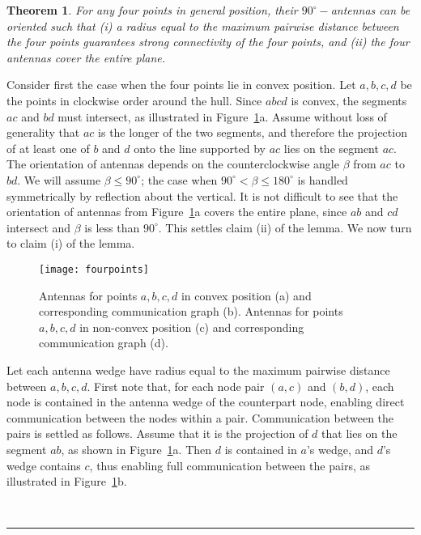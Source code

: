 \documentclass[11pt]{article}
\newtheorem{theorem}{Theorem}
\newcommand{\qed}{\rule{0.5em}{1.5ex}}
\newcommand{\fqed}{{\hfill~\qed}}
\newenvironment{proof}{{\noindent \bf Proof.}}
                      {{\hfill \fqed} \vspace{1em}}
\begin{document}
\begin{theorem}
For any four points in general position, their $90^\circ-$antennas
can be oriented such that (i) a radius equal to the maximum pairwise
distance between the four points guarantees strong connectivity
of the four points, and (ii) the four antennas cover the entire plane.
\label{thm:fourpoints}
\end{theorem}
\begin{proof}
Consider first the case when the four points lie in convex
position. Let $a, b, c, d$ be the points in clockwise order around
the hull. Since $abcd$ is convex, the segments $ac$ and $bd$ must
intersect, as illustrated in Figure~\ref{fig:fourpoints}a.
Assume without loss of generality that $ac$ is the longer of the
two segments, and therefore the projection of at least one of $b$
and $d$ onto the line supported by $ac$ lies on the segment $ac$.
The orientation of antennas depends on the counterclockwise
angle $\beta$ from $ac$ to $bd$. We will assume $\beta \leq 90^\circ$;
the case when $90^\circ < \beta \leq 180^\circ$ is handled
symmetrically by reflection about the vertical.
It is not difficult to see that the orientation of antennas
from Figure~\ref{fig:fourpoints}a covers the entire plane, since
$ab$ and $cd$ intersect and $\beta$ is less than $90^\circ$. This
settles claim (ii) of the lemma. We now turn to claim (i) of the lemma.

\begin{figure}[htpb]
\centering
\texttt{[image: fourpoints]}
\caption{ Antennas for points $a, b, c, d$ in convex position (a) and corresponding communication graph (b).
Antennas for points $a, b, c, d$ in non-convex position (c) and corresponding communication graph (d).}
\label{fig:fourpoints}
\end{figure}

Let each antenna wedge have radius equal to the maximum
pairwise distance between $a, b, c, d$.
First note that, for each node pair $(a, c)$ and $(b, d)$, each
node is contained in the antenna wedge of the counterpart node,
enabling direct communication between the nodes within a pair.
Communication between the pairs is settled as follows. Assume
that it is the projection of $d$ that lies on the segment
$ab$, as shown in Figure~\ref{fig:fourpoints}a.
Then $d$ is contained in $a$'s wedge, and $d$'s wedge
contains $c$, thus enabling full communication between the pairs, as
illustrated in Figure~\ref{fig:fourpoints}b.


\end{proof}
\end{document}
